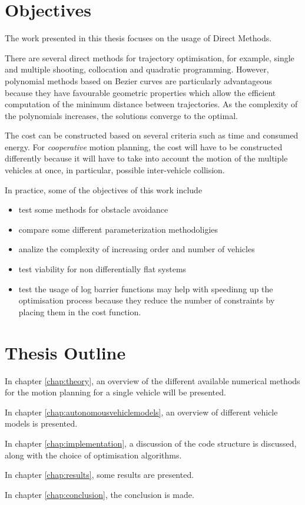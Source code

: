 \section{Objectives}


\par The work presented in this thesis focuses on the usage of Direct Methods.
\par There are several direct methods for trajectory optimisation, for example, single and multiple shooting, collocation and quadratic programming. However, polynomial methods based on Bezier curves are particularly advantageous because they have favourable geometric properties which allow the efficient computation of the minimum distance between trajectories. As the complexity of the polynomials increases, the solutions converge to the optimal.
\par The cost can be constructed based on several criteria such as time and consumed energy. For \textit{cooperative} motion planning, the cost will have to be constructed differently because it will have to take into account the motion of the multiple vehicles at once, in particular, possible inter-vehicle collision.
\par In practice, some of the objectives of this work include
\begin{itemize}
    \item test some methods for obstacle avoidance
    \item compare some different parameterization methodoligies
    \item analize the complexity of increasing order and number of vehicles
    \item test viability for non differentially flat systems
    \item test the usage of log barrier functions may help with speedinng up the optimisation process because they reduce the number of constraints by placing them in the cost function.
\end{itemize}


\section{Thesis Outline}

\par In chapter \ref{chap:theory}, an overview of the different available numerical methods for the motion planning for a single vehicle will be presented. 
\par In chapter \ref{chap:autonomousvehiclemodels}, an overview of different vehicle models is presented. 
\par In chapter \ref{chap:implementation}, a discussion of the code structure is discussed, along with the choice of optimisation algorithms. 
\par In chapter \ref{chap:results}, some results are presented. 
\par In chapter \ref{chap:conclusion}, the conclusion is made. 

